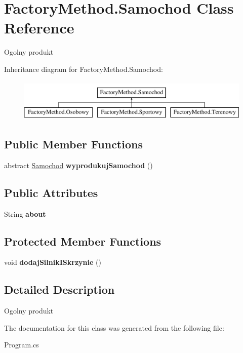 \hypertarget{class_factory_method_1_1_samochod}{}\section{Factory\+Method.\+Samochod Class Reference}
\label{class_factory_method_1_1_samochod}


Ogolny produkt  


Inheritance diagram for Factory\+Method.\+Samochod\+:\begin{figure}[H]
\begin{center}
\leavevmode
\includegraphics[height=2.000000cm]{class_factory_method_1_1_samochod}
\end{center}
\end{figure}
\subsection*{Public Member Functions}
\begin{DoxyCompactItemize}
\item 
\mbox{\label{class_factory_method_1_1_samochod_a6e62670eb42c73db3e170ef3d017b20a}} 
abstract \hyperlink{class_factory_method_1_1_samochod}{Samochod} {\bfseries wyprodukuj\+Samochod} ()
\end{DoxyCompactItemize}
\subsection*{Public Attributes}
\begin{DoxyCompactItemize}
\item 
\mbox{\label{class_factory_method_1_1_samochod_a047ada1e3670069478edd62a77f53281}} 
String {\bfseries about}
\end{DoxyCompactItemize}
\subsection*{Protected Member Functions}
\begin{DoxyCompactItemize}
\item 
\mbox{\label{class_factory_method_1_1_samochod_a99d567a7c29de85f47acf79228ee9f32}} 
void {\bfseries dodaj\+Silnik\+I\+Skrzynie} ()
\end{DoxyCompactItemize}


\subsection{Detailed Description}
Ogolny produkt 



The documentation for this class was generated from the following file\+:\begin{DoxyCompactItemize}
\item 
Program.\+cs\end{DoxyCompactItemize}
